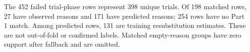 The 452 failed trial-phase rows represent 398 unique trials. Of 198 matched rows, 27 have observed reasons and 171 have predicted reasons; 254 rows have no Part 1 match. Among predicted rows, 131 are training resubstitution estimates. These are not out-of-fold or confirmed labels. Matched empty-reason groups have zero support after fallback and are omitted.
